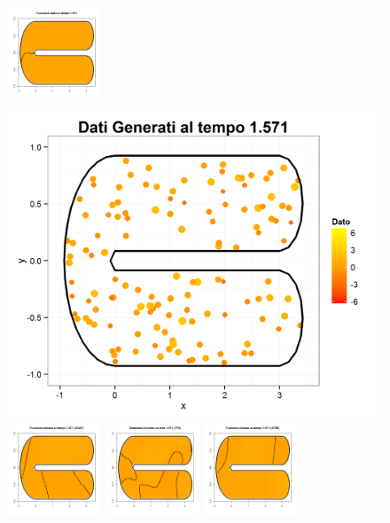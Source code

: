 \documentclass[a4paper,11pt,twoside,openright]{book}							%
\begin{document}
\begin{landscape}
\begin{figure}
\includegraphics[width=0.25\textwidth]{immagini/simulazioni_covar/REALEtempo3.png}
\includegraphics[height=0.25\textwidth]{immagini/simulazioni_covar/Dati_tempo3.png}
\includegraphics[width=0.25\textwidth]{immagini/simulazioni_covar/SOAPtempo3.png}
\includegraphics[width=0.25\textwidth]{immagini/simulazioni_covar/TPStempo3.png}
\includegraphics[width=0.25\textwidth]{immagini/simulazioni_covar/STSRtempo3.png}


\end{figure}
\end{landscape}
\end{document}
